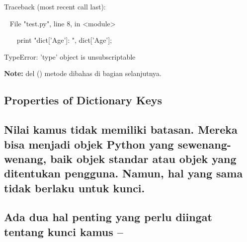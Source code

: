 \documentclass[a4paper,12pt]{report}
\begin{document}
\noindent 
{\fontsize{9pt}{9pt}\selectfont  \hspace*{0.5in} Traceback (most recent call last):} \par
\noindent 
{\fontsize{9pt}{9pt}\selectfont ~  \hspace*{0.5in} File "test.py", line 8, in <module>} \par
\noindent 
{\fontsize{9pt}{9pt}\selectfont ~~~  \hspace*{0.5in}  \hspace*{0.5in} print "dict['Age']: ", dict['Age'];} \par
\noindent 
{\fontsize{9pt}{9pt}\selectfont  \hspace*{0.5in} TypeError: 'type' object is unsubscriptable} \par
\begin{adjustwidth}{0.03in}{0.03in}
\textbf{Note:} del () metode dibahas di bagian selanjutnya.\end{adjustwidth}
 \par
\vspace{12pt}
\subsection*{Properties of Dictionary Keys}
 \par
\subsection*{Nilai kamus tidak memiliki batasan. Mereka bisa menjadi objek Python yang sewenang-wenang, baik objek standar atau objek yang ditentukan pengguna. Namun, hal yang sama tidak berlaku untuk kunci.}
 \par
\subsection*{Ada dua hal penting yang perlu diingat tentang kunci kamus –}
 \par
\end{document}
